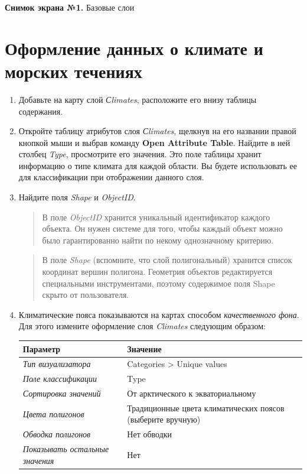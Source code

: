\documentclass[12pt,]{book}
\begin{document}
\textbf{Снимок экрана №1.} Базовые слои

\hypertarget{map-design-climates-thematic}{%
\section{Оформление данных о климате и морских течениях}\label{map-design-climates-thematic}}

\begin{enumerate}
\def\labelenumi{\arabic{enumi}.}
\item
  Добавьте на карту слой \emph{Сlimates}, расположите его внизу таблицы содержания.
\item
  Откройте таблицу атрибутов слоя \emph{Сlimates}, щелкнув на его названии правой кнопкой мыши и выбрав команду \textbf{Open Attribute Table}. Найдите в ней столбец \emph{Type}, просмотрите его значения. Это поле таблицы хранит информацию о типе климата для каждой области. Вы будете использовать ее для классификации при отображении данного слоя.
\item
  Найдите поля \emph{Shape} и \emph{ObjectID}.

  \begin{quote}
  В поле \emph{ObjectID} хранится уникальный идентификатор каждого объекта. Он нужен системе для того, чтобы каждый объект можно было гарантированно найти по некому однозначному критерию.
  \end{quote}

  \begin{quote}
  В поле \emph{Shape} (вспомните, что слой полигональный) хранится список координат вершин полигона. Геометрия объектов редактируется специальными инструментами, поэтому содержимое поля Shape скрыто от пользователя.
  \end{quote}
\item
  Климатические пояса показываются на картах способом \emph{качественного фона}. Для этого измените оформление слоя \emph{Climates} следующим образом:

  \begin{longtable}[]{@{}ll@{}}
  \toprule
  \textbf{Параметр} & \textbf{Значение}\tabularnewline
  \midrule
  \endhead
  \emph{Тип визуализатора} & Categories \textgreater{} Unique values\tabularnewline
  \emph{Поле классификации} & Type\tabularnewline
  \emph{Сортировка значений} & От арктического к экваториальному\tabularnewline
  \emph{Цвета полигонов} & Традиционные цвета климатических поясов (выберите вручную)\tabularnewline
  \emph{Обводка полигонов} & Нет обводки\tabularnewline
  \emph{Показывать остальные значения} & Нет\tabularnewline
  \bottomrule
  \end{longtable}


\end{enumerate}
\end{document}
